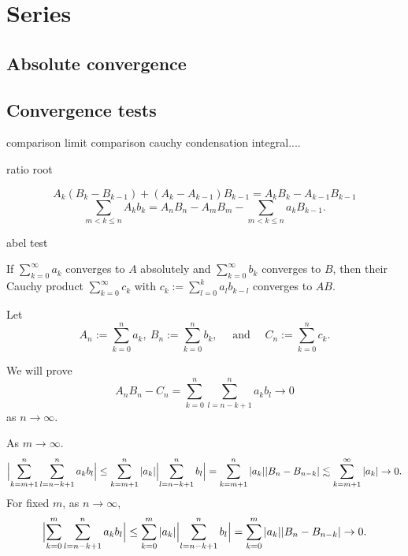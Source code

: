 \documentclass{../note}
\begin{document}
\chapter{Series}

\section{Absolute convergence}
\begin{prb}
\end{prb}


\section{Convergence tests}

comparison
limit comparison
cauchy condensation
integral....

ratio
root


\begin{prb}
\[A_k(B_k-B_{k-1})+(A_k-A_{k-1})B_{k-1}=A_kB_k-A_{k-1}B_{k-1}\]
\[\sum_{m<k\le n}A_kb_k=A_nB_n-A_mB_m-\sum_{m<k\le n}a_kB_{k-1}.\]
\end{prb}

abel test
\begin{prb}
\end{prb}


\begin{prb}
If $\sum_{k=0}^\infty a_k$ converges to $A$ absolutely and $\sum_{k=0}^\infty b_k$ converges to $B$, then their Cauchy product $\sum_{k=0}^\infty c_k$ with $c_k:=\sum_{l=0}^ka_lb_{k-l}$ converges to $AB$.
\end{prb}
\begin{pf}
Let
\[A_n:=\sum_{k=0}^na_k,\ B_n:=\sum_{k=0}^nb_k,\quad\text{ and }\quad C_n:=\sum_{k=0}^nc_k.\]

We will prove
\[A_nB_n-C_n=\sum_{k=0}^n\sum_{l=n-k+1}^na_kb_l\to0\]
as $n\to\infty$.

As $m\to\infty$.
\[\Bigl|\sum_{k=m+1}^n\sum_{l=n-k+1}^na_kb_l\Bigr|\le\sum_{k=m+1}^n|a_k|\Bigl|\sum_{l=n-k+1}^nb_l\Bigr|=\sum_{k=m+1}^n|a_k||B_n-B_{n-k}|\lesssim\sum_{k=m+1}^\infty|a_k|\to0.\]
For fixed $m$, as $n\to\infty$,
\[\Bigl|\sum_{k=0}^m\sum_{l=n-k+1}^na_kb_l\Bigr|\le\sum_{k=0}^m|a_k|\Bigl|\sum_{l=n-k+1}^nb_l\Bigr|=\sum_{k=0}^m|a_k||B_n-B_{n-k}|\to0.\]
\end{pf}
\end{document}
